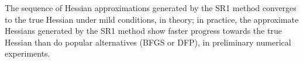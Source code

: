 The sequence of Hessian approximations generated by the SR1 method converges to the true Hessian under mild conditions, in theory; in practice, the approximate Hessians generated by the SR1 method show faster progress towards the true Hessian than do popular alternatives (BFGS or DFP), in preliminary numerical experiments.
